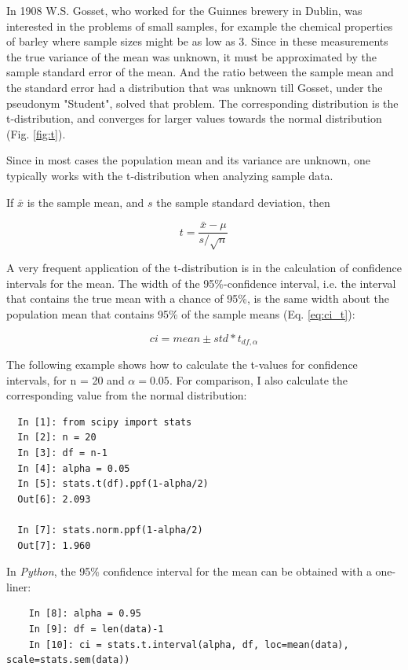 In 1908 W.S. Gosset, who worked for the Guinnes brewery in Dublin, was interested in the problems of small samples, for example the chemical properties of barley where sample sizes might be as low as 3. Since in these measurements the true variance of the mean was unknown, it must be approximated by the sample standard error of the mean. And the ratio between the sample mean and the standard error had a distribution that was unknown till Gosset, under the  pseudonym "Student", solved that problem.
The corresponding distribution is the t-distribution, and converges for larger values towards the normal distribution (Fig. \ref{fig:t}).

Since in most cases the population mean and its variance are unknown, one typically works with the t-distribution when analyzing sample data.

If $\bar{x}$ is the sample mean, and $s$ the sample standard deviation, then

\begin{equation}
  t = \frac{\bar{x}-\mu}{s/ \sqrt{n}}
\end{equation}\label{eq:Tdistribution}

A very frequent application of the t-distribution is in the calculation of confidence intervals for the mean. The width of the 95\%-confidence interval, i.e. the interval that contains the true mean with a chance of 95\%, is the same width about the population mean that contains 95\% of the sample means (Eq. \ref{eq:ci_t}):

\begin{equation}
  ci = mean \pm std * t_{df,\alpha}
\end{equation}\label{eq:ci_t}

The following example shows how to calculate the t-values for confidence intervals, for n = 20 and $\alpha=0.05$. For comparison, I also calculate the corresponding value from the normal distribution:

\begin{lstlisting}
  In [1]: from scipy import stats
  In [2]: n = 20
  In [3]: df = n-1
  In [4]: alpha = 0.05
  In [5]: stats.t(df).ppf(1-alpha/2)
  Out[6]: 2.093

  In [7]: stats.norm.ppf(1-alpha/2)
  Out[7]: 1.960
\end{lstlisting}


In \emph{Python}, the 95\% confidence interval for the mean can be obtained with a one-liner:

\begin{lstlisting}
    In [8]: alpha = 0.95
    In [9]: df = len(data)-1
    In [10]: ci = stats.t.interval(alpha, df, loc=mean(data), scale=stats.sem(data))
\end{lstlisting}

